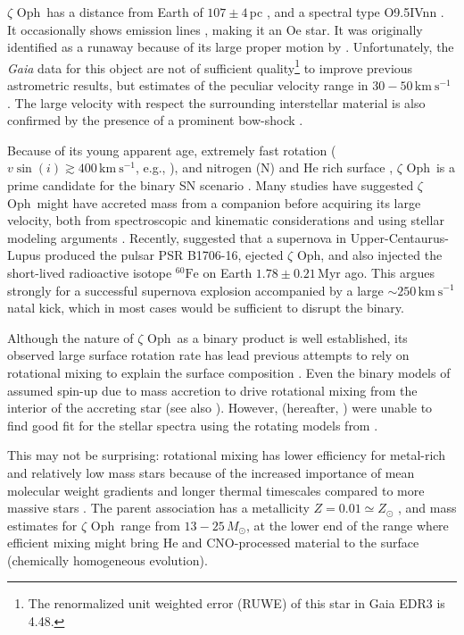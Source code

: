\documentclass[twocolumn,twocolappendix,trackchanges]{aastex63}
\newcommand{\kms}{{\mathrm{km\ s^{-1}}}}
\newcommand{\zoph}{$\zeta$ Oph}
\begin{document}
\zoph\ has a distance from Earth of $107\pm4$\,pc \citep[][and
references therein]{neuhauser:20}, and a spectral type O9.5{\rm IVnn}
\citep{sota:14}. It occasionally shows emission lines
\citep{walker:79, vink:09}, making it an Oe star. It was originally
identified as a runaway because of its large proper motion by
\cite{blaauw:52}. Unfortunately, the \emph{Gaia} data for this object
are not of sufficient quality\footnote{The renormalized unit weighted
  error (RUWE) of this star in Gaia EDR3 is 4.48.} to improve previous astrometric results,
but estimates of the peculiar velocity range in $30-50\,\kms$
\citep[e.g.,][]{zehe:18, neuhauser:20}. The large velocity with
respect the surrounding interstellar material is also confirmed by the
presence of a prominent bow-shock \citep[e.g.,][]{bodensteiner:18}.

Because of its young apparent age, extremely fast rotation
($v\sin(i)\gtrsim 400\,\kms$, e.g., \citealt{zehe:18}), and nitrogen
(N) and He rich surface \citep[e.g.,][]{herrero:92, blaauw:93,
  villamariz:05, marcolino:09}, \zoph\ is a prime candidate for the
binary SN scenario \citep{blaauw:93}. Many studies have
suggested \zoph\ might have accreted mass from a companion before
acquiring its large velocity, both from spectroscopic and kinematic
considerations \citep[e.g.,][]{blaauw:93, hoogerwerf:00,
  hoogerwerf:01, tetzlaff:10, neuhauser:20} and using stellar modeling
arguments \citep[e.g.,][]{vanrensbergen:96}. Recently,
\cite{neuhauser:20} suggested that a supernova in
Upper-Centaurus-Lupus produced the pulsar PSR B1706-16, ejected \zoph,
and also injected the short-lived radioactive isotope
$^{60}\mathrm{Fe}$ on Earth $1.78\pm0.21$\,Myr ago. This argues
strongly for a successful supernova explosion accompanied by a large
$\sim 250\,\kms$ natal kick, which in most cases would be sufficient
to disrupt the binary.

Although the nature of \zoph\ as a binary product is well established,
its observed large surface rotation rate has lead previous attempts to
rely on rotational mixing to explain the surface composition
\cite[e.g.,][]{maeder:00}. Even the binary models of
\cite{vanrensbergen:96} assumed spin-up due to mass accretion to drive
rotational mixing from the interior of the accreting star (see also
\citealt{cantiello:07}). However, \cite{villamariz:05} (hereafter, ) were unable to
find good fit for the stellar spectra using the rotating models from
\cite{meynet:00}.

This may not be surprising: rotational mixing has lower efficiency for
metal-rich and relatively low mass stars because of the increased
importance of mean molecular weight gradients and longer thermal
timescales compared to more massive stars \citep[e.g.,][]{yoon:06,
  perna:14}. The parent association has a metallicity $Z=0.01\simeq Z_\odot$
\citep[based on asteroseismology from][]{murphy:21}, and mass estimates for \zoph\ range from
$13-25\,M_\odot$, at the lower end of the range where efficient mixing
might bring He and CNO-processed material to the surface (chemically
homogeneous evolution).
\end{document}
